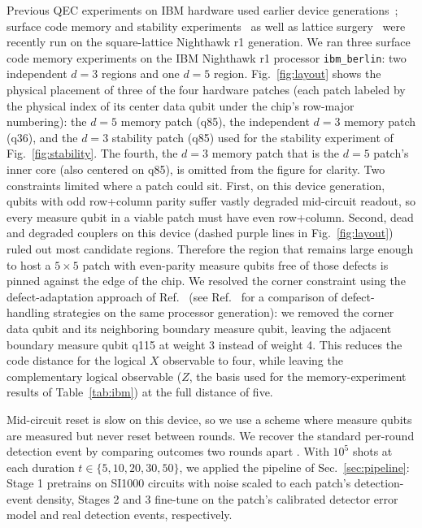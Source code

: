 \documentclass[aps,prxquantum,twocolumn,superscriptaddress,nofootinbib]{revtex4-2}
\begin{document}
Previous QEC experiments on IBM hardware used earlier device generations~\cite{wootton2018repetition,chen2022calibrated,sundaresan2023matching,gupta2024magic,hetenyi2024creating,lee2026scalable}; surface code memory and stability experiments~\cite{drouet2026error,granath2026avkodning} as well as lattice surgery~\cite{lilja2026lattice} were recently run on the square-lattice Nighthawk r1 generation. We ran three surface code memory experiments on the IBM Nighthawk r1 processor \texttt{ibm\_berlin}: two independent $d=3$ regions and one $d=5$ region. Fig.~\ref{fig:layout} shows the physical placement of three of the four hardware patches (each patch labeled by the physical index of its center data qubit under the chip's row-major numbering): the $d=5$ memory patch (q85), the independent $d=3$ memory patch (q36), and the $d=3$ stability patch (q85) used for the stability experiment of Fig.~\ref{fig:stability}. The fourth, the $d=3$ memory patch that is the $d=5$ patch's inner core (also centered on q85), is omitted from the figure for clarity. Two constraints limited where a patch could sit. First, on this device generation, qubits with odd row+column parity suffer vastly degraded mid-circuit readout, so every measure qubit in a viable patch must have even row+column. Second, dead and degraded couplers on this device (dashed purple lines in Fig.~\ref{fig:layout}) ruled out most candidate regions. Therefore the region that remains large enough to host a $5\times5$ patch with even-parity measure qubits free of those defects is pinned against the edge of the chip. We resolved the corner constraint using the defect-adaptation approach of Ref.~\cite{leroux2025snakes} (see Ref.~\cite{drouet2026error} for a comparison of defect-handling strategies on the same processor generation): we removed the corner data qubit and its neighboring boundary measure qubit, leaving the adjacent boundary measure qubit q115 at weight 3 instead of weight 4. This reduces the code distance for the logical $X$ observable to four, while leaving the complementary logical observable ($Z$, the basis used for the memory-experiment results of Table~\ref{tab:ibm}) at the full distance of five.

Mid-circuit reset is slow on this device, so we use a scheme where measure qubits are measured but never reset between rounds. We recover the standard per-round detection event by comparing outcomes two rounds apart \cite{geher2025reset}. With $10^5$ shots at each duration $t \in \{5, 10, 20, 30, 50\}$, we applied the pipeline of Sec.~\ref{sec:pipeline}: Stage 1 pretrains on SI1000 circuits with noise scaled to each patch's detection-event density, Stages 2 and 3 fine-tune on the patch's calibrated detector error model and real detection events, respectively.
\end{document}
